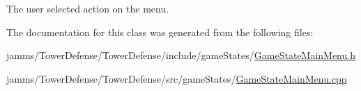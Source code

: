 The user selected action on the menu. 



The documentation for this class was generated from the following files\+:\begin{DoxyCompactItemize}
\item 
jamms/\+Tower\+Defense/\+Tower\+Defense/include/game\+States/\hyperlink{_game_state_main_menu_8h}{Game\+State\+Main\+Menu.\+h}\item 
jamms/\+Tower\+Defense/\+Tower\+Defense/src/game\+States/\hyperlink{_game_state_main_menu_8cpp}{Game\+State\+Main\+Menu.\+cpp}\end{DoxyCompactItemize}
